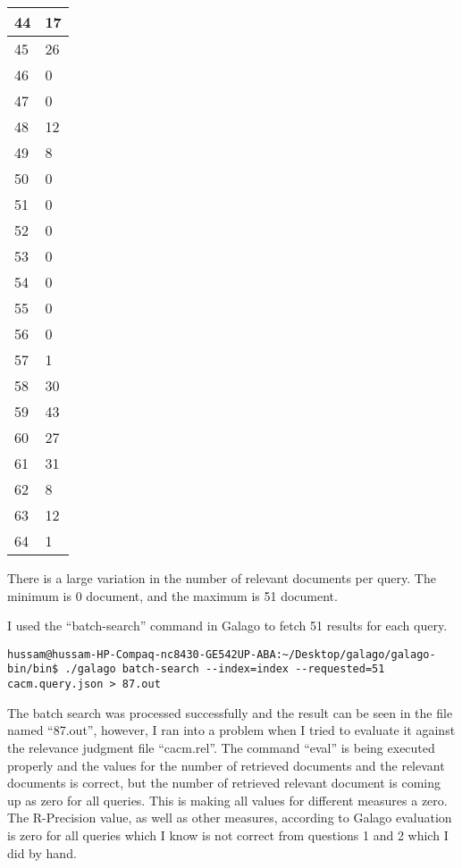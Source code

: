 \begin{longtable}{ |p{3cm}|p{6cm}| }
\hline
44 & 17 \\
\hline
45 & 26 \\
\hline
46 & 0 \\
\hline
47 & 0 \\
\hline
48 & 12 \\
\hline
49 & 8 \\
\hline
50 & 0 \\
\hline
51 & 0 \\
\hline
52 & 0 \\
\hline
53 & 0 \\
\hline
54 & 0 \\
\hline
55 & 0 \\
\hline
56 & 0 \\
\hline
57 & 1 \\
\hline
58 & 30 \\
\hline
59 & 43 \\
\hline
60 & 27 \\
\hline
61 & 31 \\
\hline
62 & 8 \\
\hline
63 & 12 \\
\hline
64 & 1 \\
\hline
\end{longtable}

There is a large variation in the number of relevant documents per query. The minimum is 0 document, and the maximum is 51 document.

I used the ``batch-search'' command in Galago to fetch 51 results for each query. 

\begin{lstlisting}[breakatwhitespace=〈false)]
hussam@hussam-HP-Compaq-nc8430-GE542UP-ABA:~/Desktop/galago/galago-bin/bin$ ./galago batch-search --index=index --requested=51 cacm.query.json > 87.out
\end{lstlisting}
The batch search was processed successfully and the result can be seen in the file named ``87.out'', however, I ran into a problem when I tried to evaluate it against the relevance judgment file ``cacm.rel''. The command ``eval'' is being executed properly and the values for the number of retrieved documents and the relevant documents is correct, but the number of retrieved relevant document is coming up as zero for all queries. This is making all values for different measures a zero. The R-Precision value, as well as other measures, according to Galago evaluation is zero for all queries which I know is not correct from questions 1 and 2 which I did by hand.

